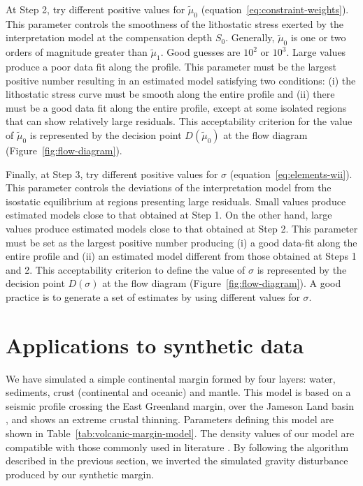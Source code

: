 \documentclass[manuscript,revised]{geophysics}
\begin{document}
At Step 2, try different positive values for $\tilde{\mu}_{0}$ 
(equation~\ref{eq:constraint-weights}). This parameter
controls the smoothness of the lithostatic stress exerted by the interpretation model
at the compensation depth $S_{0}$. Generally, $\tilde{\mu}_{0}$ is one or two 
orders of magnitude greater than $\tilde{\mu}_{1}$. 
Good guesses are $10^{2}$ or $10^{3}$.
Large values produce a poor data fit along the profile.
This parameter must be the largest positive number resulting in an estimated
model satisfying two conditions: (i) the lithostatic stress curve must be smooth
along the entire profile and (ii) there must be a good data fit along the entire
profile, except at some isolated regions that can show relatively large residuals.
This acceptability criterion for the value of $\tilde{\mu}_{0}$ is
represented by the decision point $D(\tilde{\mu}_{0})$ 
at the flow diagram (Figure~\ref{fig:flow-diagram}).

Finally, at Step 3, try different positive values for $\sigma$ (equation~\ref{eq:elements-wii}).
This parameter controls the deviations of the interpretation model from the
isostatic equilibrium at regions presenting large residuals.
Small values produce estimated models close to that obtained at Step 1.
On the other hand, large values produce estimated models close to that
obtained at Step 2.
This parameter must be set as the largest positive number producing (i) a good data-fit
along the entire profile and (ii) an estimated model different from those obtained
at Steps 1 and 2.
This acceptability criterion to define the value of $\sigma$ is
represented by the decision point $D(\sigma)$ 
at the flow diagram (Figure~\ref{fig:flow-diagram}).
A good practice is to generate a set of estimates by using different 
values for $\sigma$. 


\section{Applications to synthetic data}


We have simulated a simple continental margin formed by four layers: 
water, sediments, crust (continental and oceanic) and mantle.
This model is based on a seismic profile crossing the East Greenland margin,
over the Jameson Land basin \citep{peron-etal2013}, and shows an extreme crustal thinning.
Parameters defining this model are shown in Table~\ref{tab:volcanic-margin-model}.
The density values of our model are compatible with those commonly used in literature
\citep[e.g., ][]{gradmann-etal2017}.
By following the algorithm described in the previous section, we inverted the simulated 
gravity disturbance produced by our synthetic margin.
\end{document}
